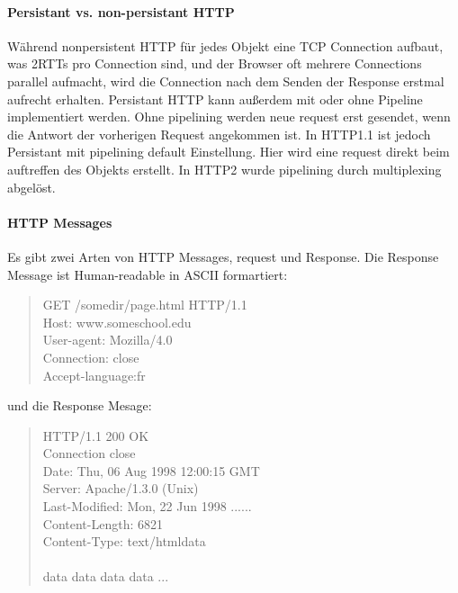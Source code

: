 		\paragraph{Persistant vs. non-persistant HTTP} 
			Während nonpersistent HTTP für jedes Objekt eine TCP Connection aufbaut, was 2RTTs pro Connection sind, und der Browser oft mehrere Connections parallel aufmacht, wird die Connection nach dem Senden der Response erstmal aufrecht erhalten. Persistant HTTP kann außerdem mit oder ohne Pipeline implementiert werden. Ohne pipelining werden neue request erst gesendet, wenn die Antwort der vorherigen Request angekommen ist. In HTTP1.1 ist jedoch Persistant mit pipelining default Einstellung. Hier wird eine request direkt beim auftreffen des Objekts erstellt. In HTTP2 wurde pipelining durch multiplexing abgelöst. 
		
		\paragraph{HTTP Messages}
			Es gibt zwei Arten von HTTP Messages, request und Response. Die Response Message ist Human-readable in ASCII formartiert:
			\begin{quote}
				GET /somedir/page.html HTTP/1.1 \\
				Host: www.someschool.edu\\
				User-agent: Mozilla/4.0\\
				Connection: close \\
				Accept-language:fr
			\end{quote}
			und die Response Mesage:
			\begin{quote}
				HTTP/1.1 200 OK \\
				Connection close \\
				Date: Thu, 06 Aug 1998 12:00:15 GMT \\
				Server: Apache/1.3.0 (Unix) \\
				Last-Modified: Mon, 22 Jun 1998 ...... \\
				Content-Length: 6821 \\
				Content-Type: text/htmldata \\ \\
				data data data data ...
			\end{quote}

